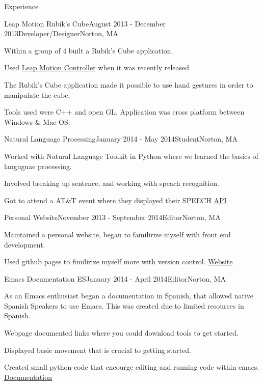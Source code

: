 \documentclass{resume} %
\begin{document}
\begin{rSection}{Experience}

\begin{rSubsection}{Leap Motion Rubik's Cube}{August 2013 - December 2013}{Developer/Designer}{Norton, MA}
\item Within a group of 4 built a Rubik's Cube application.
\item Used \href{https://www.leapmotion.com/}{Leap Motion Controller} when it was recently released
\item The Rubik's Cube application made it possible to use hand gestures in order to  manipulate the cube. 

\item Tools used were C++ and open GL. Application was cross platform  between Windows \& Mac OS.  

\end{rSubsection}


\begin{rSubsection}{Natural Language Processing}{January 2014 - May 2014}{Student}{Norton, MA}
\item Worked with Natural Language Toolkit in Python where we learned the basics of languguae processing.
\item  Involved breaking up sentence, and working with speach recognition.
\item Got to attend a AT\&T event where they displayed their SPEECH \href{http://www.research.att.com/projects/WATSON/}{API}


\end{rSubsection}
\begin{rSubsection}{Personal Website}{November 2013 - September 2014}{Editor}{Norton, MA}
\item  Maintained a personal website, began to familirize myself with front end development.
\item  Used github pages to fimilirize myself more with version control. \href{http://guti15.github.io/}{Website}


\end{rSubsection}


\begin{rSubsection}{Emacs Documentation ES}{January 2014 - April 2014}{Editor}{Norton, MA}
\item As an Emacs enthusiast began a documentation in Spanish, that allowed native Spanish Speakers to use Emacs.  This was created due to limited resources in Spanish. 
\item Webpage documented links where you could download tools to get started.
\item Displayed basic movement that is crucial to getting started.  
\item Created small python code that encourge editing and running code within emacs. \href{http://guti15.github.io/Emacs_Documentation_es/Intro.html}{Documentation}


\end{rSubsection}
\end{rSection}
\end{document}
